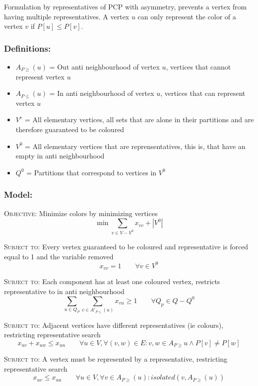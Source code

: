 \documentclass[a4paper]{article}
\newenvironment{lpmodel}{\subsubsection*{Model:} }{ }
\newcommand{\lpobjective}[2]{\textsc{Objective:} #1 \[ #2 \]}
\newcommand{\lprestriction}[3]{\textsc{Subject to:} #1 \[ #2 \qquad #3 \]}
\begin{document}
Formulation by representatives of PCP with asymmetry, prevents a vertex from having multiple representatives. A vertex $u$ can only represent the color of a vertex $v$ if $P[u] \leq P[v]$.

\subsubsection*{Definitions:}

\begin{itemize}
\item{$A_{P\geq}(u)$ = Out anti neighbourhood of vertex $u$, vertices that cannot represent vertex $u$}
\item{$A_{P\leq}(u)$ = In anti neighbourhood of vertex $u$, vertices that can represent vertex $u$}
\item{$V^e$ = All elementary vertices, all sets that are alone in their partitions and are therefore guaranteed to be coloured}
\item{$V^0$ = All elementary vertices that are reprensentatives, this is, that have an empty in anti neighbourhood}
\item{$Q^0$ = Partitions that correspond to vertices in $V^0$}
\end{itemize}

\begin{lpmodel}

\lpobjective{Minimize colors by minimizing vertices}
{\min \sum_{v \in V - V^0} x_{vv} + |V^0|}

\lprestriction{Every vertex guaranteed to be coloured and representative is forced equal to 1 and the variable removed}
{x_{vv} = 1}{\forall v \in V^0}

\lprestriction{Each component has at least one coloured vertex, restricts representative to in anti neighbourhood}
{\sum_{u \in Q_P} \sum_{v \in A'_{P\leq}(u)} x_{vu} \geq 1}{\forall Q_p \in Q - Q^0}

\lprestriction{Adjacent vertices have different representatives (ie colours), restricting representative search}
{x_{uv} + x_{uw} \leq x_{uu}}{\forall u \in V, \forall (v,w) \in E : v,w \in A_{P\geq}{u} \wedge P[v] \neq P[w]}

\lprestriction{A vertex must be represented by a representative, restricting representative search}
{x_{uv} \leq x_{uu}}{\forall u \in V, \forall v \in A_{P\geq}(u) : isolated(v, A_{P\geq}(u))}

\end{lpmodel}
\end{document}

